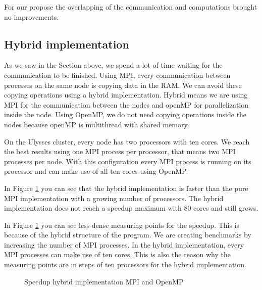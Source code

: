 For our propose the overlapping of the communication and computations brought no improvements.

\subsection{Hybrid implementation}
\label{sec:hybrid}
As we saw in the Section above, we spend a lot of time waiting for the communication to be finished.
Using MPI, every communication between processes on the same node is copying data in the RAM.
We can avoid these copying operations using a hybrid implementation.
Hybrid means we are using MPI for the communication between the nodes and openMP for parallelization inside the node.
Using OpenMP, we do not need copying operations inside the nodes because openMP is multithread with shared memory.

On the Ulysses cluster, every node has two processors with ten cores.
We reach the best results using one MPI process per processor, that means two MPI processes per node.
With this configuration every MPI process is running on its processor and can make use of all ten cores using OpenMP.

In Figure \ref{fig:bench5} you can see that the hybrid implementation is faster than the pure MPI implementation with a growing number of processors.
The hybrid implementation does not reach a speedup maximum with 80 cores and  still grows.

In Figure \ref{fig:bench5} you can see less dense measuring points for the speedup.
This is because of the hybrid structure of the program. 
We are creating benchmarks by increasing the number of MPI processes.
In the hybrid implementation, every MPI processes can make use of ten cores.
This is also the reason why the measuring points are in steps of ten processors for the hybrid implementation. 


\begin{figure}[H]
	\centering
	
	\caption[speedup hybrid]{Speedup hybrid implementation MPI and OpenMP}
	\label{fig:bench5}
\end{figure}

\newpage


